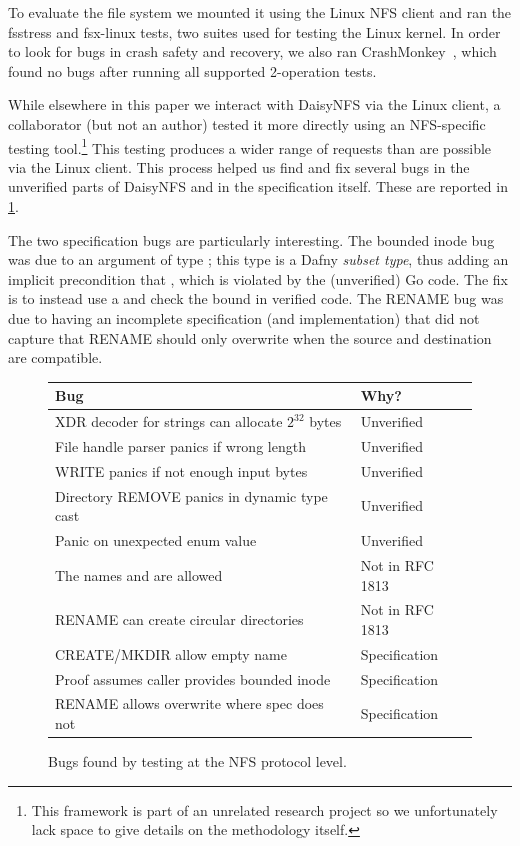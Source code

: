 To evaluate the file system we mounted it using the Linux NFS client and ran the
fsstress and fsx-linux tests, two suites used for testing the Linux kernel. In
order to look for bugs in crash safety and recovery, we also ran
CrashMonkey~\cite{mohan:crashmonkey}, which found no bugs
after running all supported 2-operation tests.

While elsewhere in this paper we interact with DaisyNFS via the Linux client, a
collaborator (but not an author) tested it more directly using an NFS-specific
testing tool.\footnote{This framework is part of an
unrelated research project so we unfortunately lack space to give details on
the methodology itself.} This testing produces a wider range of requests than
are possible via the Linux client. This process helped us find and fix several bugs in
the unverified parts of DaisyNFS and in the specification itself. These are
reported in \cref{fig:daisynfs-bugs}.

The two specification bugs are particularly interesting. The bounded inode bug
was due to an  argument of type ; this type is a Dafny
\emph{subset type}, thus adding an implicit precondition that , which is violated by the (unverified) Go code. The fix is to instead
use a  and check the bound in verified code. The RENAME bug was due
to having an incomplete specification (and implementation) that did not capture
that RENAME should only overwrite when the source and destination are
compatible.

\begin{figure}
  \small
  \begin{tabular}{@{}p{6cm}p{2.2cm}@{}}
    \toprule
    \textbf{Bug} & \textbf{Why?} \\
    \midrule
    XDR decoder for strings can allocate $2^{32}$ bytes & Unverified \\
    File handle parser panics if wrong length & Unverified \\
    WRITE panics if not enough input bytes & Unverified \\
    Directory REMOVE panics in dynamic type cast & Unverified \\
    Panic on unexpected enum value & Unverified \\
    The names \cc{.} and \cc{..} are allowed & Not in RFC 1813 \\
    RENAME can create circular directories & Not in RFC 1813 \\
    CREATE/MKDIR allow empty name & Specification \\
    Proof assumes caller provides bounded inode & Specification \\
    RENAME allows overwrite where spec does not & Specification \\
    \bottomrule
  \end{tabular}
  \caption{Bugs found by testing at the NFS protocol level.}
  \label{fig:daisynfs-bugs}
\end{figure}

